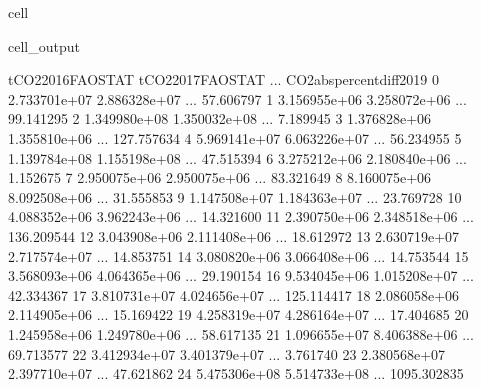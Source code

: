 \documentclass[letterpaper,10pt,english]{jupyterBook}
\begin{document}
\begin{sphinxuseclass}{cell}
\begin{sphinxVerbatimOutput}
\begin{sphinxuseclass}{cell_output}
\begin{sphinxVerbatim}[commandchars=\\\{\}]
    tCO2\PYGZus{}2016\PYGZus{}FAOSTAT  tCO2\PYGZus{}2017\PYGZus{}FAOSTAT  ...  CO2\PYGZus{}abs\PYGZus{}percent\PYGZus{}diff\PYGZus{}2019  \PYGZbs{}
0        2.733701e+07       2.886328e+07  ...                  57.606797   
1        3.156955e+06       3.258072e+06  ...                  99.141295   
2        1.349980e+08       1.350032e+08  ...                   7.189945   
3        1.376828e+06       1.355810e+06  ...                 127.757634   
4        5.969141e+07       6.063226e+07  ...                  56.234955   
5        1.139784e+08       1.155198e+08  ...                  47.515394   
6        3.275212e+06       2.180840e+06  ...                   1.152675   
7        2.950075e+06       2.950075e+06  ...                  83.321649   
8        8.160075e+06       8.092508e+06  ...                  31.555853   
9        1.147508e+07       1.184363e+07  ...                  23.769728   
10       4.088352e+06       3.962243e+06  ...                  14.321600   
11       2.390750e+06       2.348518e+06  ...                 136.209544   
12       3.043908e+06       2.111408e+06  ...                  18.612972   
13       2.630719e+07       2.717574e+07  ...                  14.853751   
14       3.080820e+06       3.066408e+06  ...                  14.753544   
15       3.568093e+06       4.064365e+06  ...                  29.190154   
16       9.534045e+06       1.015208e+07  ...                  42.334367   
17       3.810731e+07       4.024656e+07  ...                 125.114417   
18       2.086058e+06       2.114905e+06  ...                  15.169422   
19       4.258319e+07       4.286164e+07  ...                  17.404685   
20       1.245958e+06       1.249780e+06  ...                  58.617135   
21       1.096655e+07       8.406388e+06  ...                  69.713577   
22       3.412934e+07       3.401379e+07  ...                   3.761740   
23       2.380568e+07       2.397710e+07  ...                  47.621862   
24       5.475306e+08       5.514733e+08  ...                1095.302835   


\end{sphinxVerbatim}
\end{sphinxuseclass}
\end{sphinxVerbatimOutput}
\end{sphinxuseclass}
\end{document}
